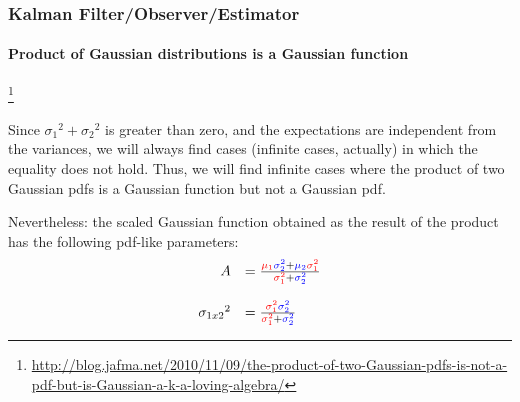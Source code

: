 \begin{frame}[plain]
\frametitle{Kalman Filter/Observer/Estimator}
\framesubtitle{Product of Gaussian distributions is a Gaussian function}

\footnote{\tiny\hspace{-0.23in} \hspace{-0.25in}
\href{http://blog.jafma.net/2010/11/09/the-product-of-two-Gaussian-pdfs-is-not-a-pdf-but-is-Gaussian-a-k-a-loving-algebra/}{http://blog.jafma.net/2010/11/09/the-product-of-two-Gaussian-pdfs-is-not-a-pdf-but-is-Gaussian-a-k-a-loving-algebra/}}
\begin{changemargin}{-1.35in}{0in}
\scriptsize
Since ${ {\sigma_{1}}^{2} + {\sigma_{2}}^{2} }$ is greater than zero, and the expectations are independent from the variances, we will always find cases (infinite cases, actually) in which the equality does not hold. Thus, we will find infinite cases where the product of two Gaussian pdfs is a Gaussian function but not a Gaussian pdf.

Nevertheless: the scaled Gaussian function obtained as the result of the product has the following pdf-like parameters:
\begin{equation*}
\begin{array}{rlllllll}
A &= \frac { {\color{red}\mu_1} {\color{blue}\sigma^2_2} + {\color{blue}\mu_2} {\color{red}\sigma^2_1} }{ {\color{red}\sigma^2_1} + {\color{blue}\sigma^2_2}}\\\\
{\sigma_{1 x 2}}^2 &= \frac{{\color{red}\sigma^2_1} {\color{blue}\sigma^2_2}}{{\color{red}\sigma^2_1} + {\color{blue}\sigma^2_2}}
\end{array}
\end{equation*}
\end{changemargin}
\end{frame}








%




